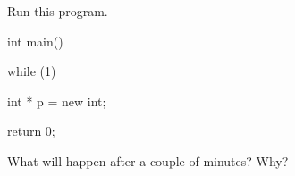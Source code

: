 Run this program.



\begin{consolethree}[escapeinside=||]

int main()

{

    while (1)

    {

        int * p = new int;

    }

    return 0;

}

\end{consolethree}

What will happen after a couple of minutes? Why?

